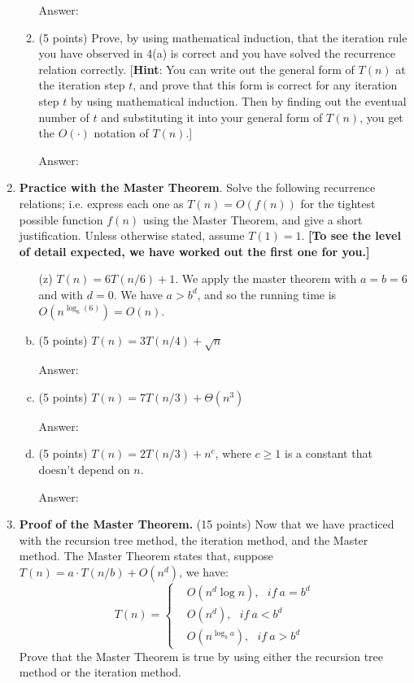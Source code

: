 \documentclass[12pt]{article}
\begin{document}
\begin{enumerate}
\begin{enumerate}
  {\color{blue}Answer: }
  
  \item (5 points) Prove, by using mathematical induction, that the iteration rule you have observed in 4(a) is correct and you have solved the recurrence relation correctly. [\textbf{Hint}: You can write out the general form of $T(n)$ at the iteration step $t$, and prove that this form is correct for any iteration step $t$ by using mathematical induction. Then by finding out the eventual number of $t$ and substituting it into your general form of $T(n)$, you get the $O(\cdot)$ notation of $T(n)$.]

  {\color{blue}Answer: }
  
  \end{enumerate}


  \item \textbf{Practice with the Master Theorem}. Solve the following recurrence relations; i.e. express each one as $T(n) = O(f(n))$ for the tightest possible function $f(n)$ using the Master Theorem, and give a short justification. Unless otherwise stated, assume $T(1) = 1$.
    \textbf{[To see the level of detail expected, we have worked out the first one for you.]}

    \begin{enumerate}[(a)]

      \item[(z)] $T(n) = 6T(n/6) + 1$.  We apply the master theorem with $a = b = 6$ and with $d = 0$.  We have $a > b^d$, and so the running time is $O(n^{\log_6(6)}) = O(n)$.

      \item (5 points) $T(n) = 3 T(n/4) + \sqrt{n}$
      
      {\color{blue}Answer: }
      
      \item (5 points) $T(n) = 7 T(n/3) + \Theta(n^3)$
      
      {\color{blue}Answer: }

      \item (5 points) $T(n) = 2 T(n/3) + n^c$, where $c \geq 1$ is a constant that doesn't depend on $n$.
      
      {\color{blue}Answer: }

    \end{enumerate}
  
  
  \item \textbf{Proof of the Master Theorem.} (15 points) Now that we have practiced with the recursion tree method, the iteration method, and the Master method. The Master Theorem states that, suppose $T(n)=a\cdot T(n/b)+O(n^d)$, we have:
  \begin{displaymath}
  T(n)=\left\{
	\begin{aligned}
	&O(n^d\log n),~~~if~a=b^d\\
	&O(n^d),~~~if~a<b^d\\
	&O(n^{\log_b a}),~~~if~a>b^d
	\end{aligned}
	\right.
  \end{displaymath}
  Prove that the Master Theorem is true by using either the recursion tree method or the iteration method.
  

\end{enumerate}
\end{document}
